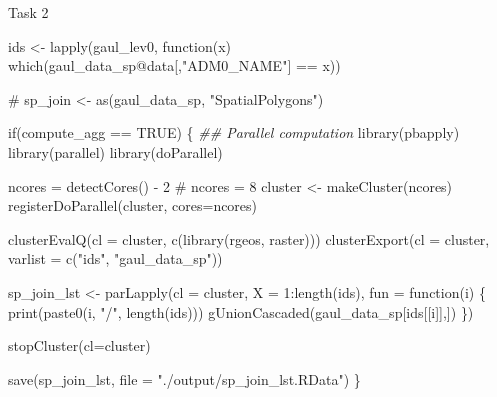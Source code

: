 \documentclass[
  ignorenonframetext,
  aspectratio=169,
]{beamer}
\newenvironment{Shaded}{\begin{snugshade}}{\end{snugshade}}
\newcommand{\AttributeTok}[1]{\textcolor[rgb]{0.40,0.45,0.13}{#1}}
\newcommand{\CommentTok}[1]{\textcolor[rgb]{0.37,0.37,0.37}{#1}}
\newcommand{\ConstantTok}[1]{\textcolor[rgb]{0.56,0.35,0.01}{#1}}
\newcommand{\ControlFlowTok}[1]{\textcolor[rgb]{0.00,0.23,0.31}{#1}}
\newcommand{\DecValTok}[1]{\textcolor[rgb]{0.68,0.00,0.00}{#1}}
\newcommand{\DocumentationTok}[1]{\textcolor[rgb]{0.37,0.37,0.37}{\textit{#1}}}
\newcommand{\FunctionTok}[1]{\textcolor[rgb]{0.28,0.35,0.67}{#1}}
\newcommand{\NormalTok}[1]{\textcolor[rgb]{0.00,0.23,0.31}{#1}}
\newcommand{\OtherTok}[1]{\textcolor[rgb]{0.00,0.23,0.31}{#1}}
\newcommand{\SpecialCharTok}[1]{\textcolor[rgb]{0.37,0.37,0.37}{#1}}
\newcommand{\StringTok}[1]{\textcolor[rgb]{0.13,0.47,0.30}{#1}}
\begin{document}
\begin{frame}[fragile]{Task 2}
\begin{Shaded}
\begin{Highlighting}[]
\NormalTok{ids }\OtherTok{\textless{}{-}} \FunctionTok{lapply}\NormalTok{(gaul\_lev0, }\ControlFlowTok{function}\NormalTok{(x) }\FunctionTok{which}\NormalTok{(gaul\_data\_sp}\SpecialCharTok{@}\NormalTok{data[,}\StringTok{"ADM0\_NAME"}\NormalTok{] }\SpecialCharTok{==}\NormalTok{ x))}

\CommentTok{\# sp\_join \textless{}{-} as(gaul\_data\_sp, "SpatialPolygons")}
\end{Highlighting}
\end{Shaded}

\linespread{2}

\linespread{0.5}

\begin{Shaded}
\begin{Highlighting}[]
\ControlFlowTok{if}\NormalTok{(compute\_agg }\SpecialCharTok{==} \ConstantTok{TRUE}\NormalTok{) \{ }\DocumentationTok{\#\# Parallel computation}
  \FunctionTok{library}\NormalTok{(pbapply)}
  \FunctionTok{library}\NormalTok{(parallel)}
  \FunctionTok{library}\NormalTok{(doParallel)}
  
\NormalTok{  ncores }\OtherTok{=} \FunctionTok{detectCores}\NormalTok{() }\SpecialCharTok{{-}} \DecValTok{2}
  \CommentTok{\# ncores = 8}
\NormalTok{  cluster }\OtherTok{\textless{}{-}} \FunctionTok{makeCluster}\NormalTok{(ncores)}
  \FunctionTok{registerDoParallel}\NormalTok{(cluster, }\AttributeTok{cores=}\NormalTok{ncores)}
  
  \FunctionTok{clusterEvalQ}\NormalTok{(}\AttributeTok{cl =}\NormalTok{ cluster, }\FunctionTok{c}\NormalTok{(}\FunctionTok{library}\NormalTok{(rgeos, raster)))}
  \FunctionTok{clusterExport}\NormalTok{(}\AttributeTok{cl =}\NormalTok{ cluster, }\AttributeTok{varlist =} \FunctionTok{c}\NormalTok{(}\StringTok{"ids"}\NormalTok{, }\StringTok{"gaul\_data\_sp"}\NormalTok{))}
  
\NormalTok{  sp\_join\_lst }\OtherTok{\textless{}{-}} \FunctionTok{parLapply}\NormalTok{(}\AttributeTok{cl =}\NormalTok{ cluster, }\AttributeTok{X =} \DecValTok{1}\SpecialCharTok{:}\FunctionTok{length}\NormalTok{(ids), }\AttributeTok{fun =} \ControlFlowTok{function}\NormalTok{(i) \{}
    \FunctionTok{print}\NormalTok{(}\FunctionTok{paste0}\NormalTok{(i, }\StringTok{"/"}\NormalTok{, }\FunctionTok{length}\NormalTok{(ids)))}
    \FunctionTok{gUnionCascaded}\NormalTok{(gaul\_data\_sp[ids[[i]],])}
\NormalTok{  \})}

  \FunctionTok{stopCluster}\NormalTok{(}\AttributeTok{cl=}\NormalTok{cluster)}
  
  \FunctionTok{save}\NormalTok{(sp\_join\_lst, }\AttributeTok{file =} \StringTok{"./output/sp\_join\_lst.RData"}\NormalTok{)}
\NormalTok{\}}
\end{Highlighting}
\end{Shaded}


\end{frame}
\end{document}
